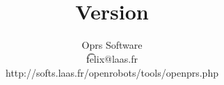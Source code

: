 \documentclass[twoside,openright]{book}
\begin{document}
\title{
        \COPRSDE{} \\
         Version \oprsdocversion{}}

\author{Oprs Software\\
        \t{felix@laas.fr} \\
        {http://softs.laas.fr/openrobots/tools/openprs.php}
}

\maketitle

\clearpage


\clearpage
\pagestyle{headings}

\tableofcontents
\listoffigures
\listoftables

\cleardoublepage
{}













\end{document}
